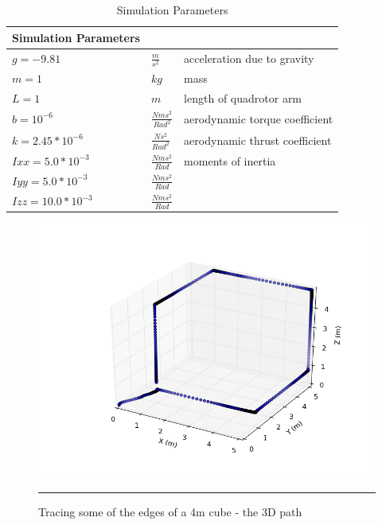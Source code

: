 \begin{table}\label{table:params}
\begin{doublespace}
\centering
\begin{tabular}{l l l}
    Simulation Parameters\\
    \hline
    $g = -9.81            $& $ \frac{m}{s^2}          $ & acceleration due to gravity\\
    $m = 1                $& $ kg                      $ & mass\\ 
    $L = 1                $& $ m                       $ & length of quadrotor arm\\
    $b = 10^{-6}          $& $ \frac{N m s^2}{Rad^2}  $ & aerodynamic torque coefficient\\
    $k = 2.45*10^{-6}     $& $ \frac{N s^2}{Rad^2}    $ & aerodynamic thrust coefficient\\
    $Ixx = 5.0*10^{-3}    $& $ \frac{N m s^2}{Rad}    $ & moments of inertia \\
    $Iyy = 5.0*10^{-3}    $& $ \frac{N m s^2}{Rad}    $ & \\
    $Izz = 10.0*10^{-3}   $& $ \frac{N m s^2}{Rad}    $ & \\
    \hline
\end{tabular}
\caption[Simulation Parameters]{Simulation Parameters}
\end{doublespace}
\end{table}

\begin{figure}[htbp]
	\centering
		\includegraphics[width=\textwidth]{Figures/CubeEdges3D.png}
		\rule{35em}{0.5pt}
	\caption[Cube Edges]{Tracing some of the edges of a 4m cube - the 3D path}
	\label{fig:Cube Edges 3D}
\end{figure}

